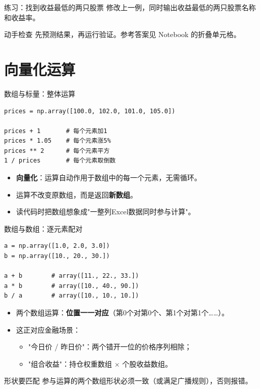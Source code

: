 \documentclass[9pt]{ctexbeamer}
\begin{document}
\begin{frame}{练习：找到收益最低的两只股票}
修改上一例，同时输出收益最低的两只股票名称和收益率。
\medskip
\begin{block}{动手检查}
先预测结果，再运行验证。参考答案见 Notebook 的折叠单元格。
\end{block}
\end{frame}

\section{向量化运算}

\begin{frame}[fragile]{数组与标量：整体运算}
	\begin{lstlisting}
prices = np.array([100.0, 102.0, 101.0, 105.0])

prices + 1       # 每个元素加1
prices * 1.05    # 每个元素涨5%
prices ** 2      # 每个元素平方
1 / prices       # 每个元素取倒数
\end{lstlisting}
	\begin{itemize}
		\item \textbf{向量化}：运算自动作用于数组中的\alert{每一个}元素，无需循环。
		\item 运算不改变原数组，而是返回\textbf{新数组}。
		\item 读代码时把数组想象成"一整列Excel数据同时参与计算"。
	\end{itemize}
\end{frame}

\begin{frame}[fragile]{数组与数组：逐元素配对}
	\begin{lstlisting}
a = np.array([1.0, 2.0, 3.0])
b = np.array([10., 20., 30.])

a + b        # array([11., 22., 33.])
a * b        # array([10., 40., 90.])
b / a        # array([10., 10., 10.])
\end{lstlisting}
	\begin{itemize}
		\item 两个数组运算：\textbf{位置一一对应}（第0个对第0个、第1个对第1个……）。
		\item 这正对应金融场景：
		\begin{itemize}
			\item "今日价 / 昨日价"：两个错开一位的价格序列相除；
			\item "组合收益"：持仓权重数组 $\times$ 个股收益数组。
		\end{itemize}
	\end{itemize}
	\begin{alertblock}{形状要匹配}
		参与运算的两个数组形状必须一致（或满足广播规则），否则报错。
	\end{alertblock}
\end{frame}
\end{document}
